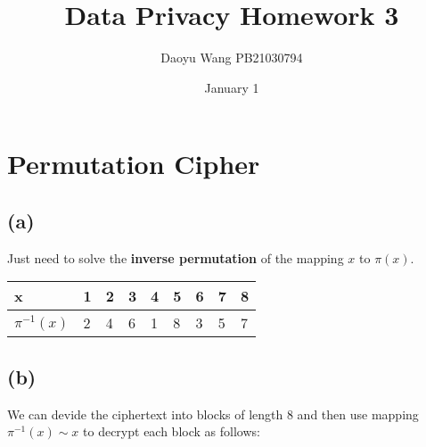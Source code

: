 \documentclass[a4paper,12pt]{article}
\title{Data Privacy Homework 3}
\author{Daoyu Wang  PB21030794}
\date{January 1}
\begin{document}
\maketitle
{}
\tableofcontents
\newpage
\section{Permutation Cipher}
\subsection{(a)}
Just need to solve the \textbf{inverse permutation} of the mapping $x$ to $\pi(x)$.
\begin{table}[!ht]
    \centering
    \begin{tabular}{|l|l|l|l|l|l|l|l|l|}
        \hline
        \textbf{x}             & \textbf{1} & \textbf{2} & \textbf{3} & \textbf{4} & \textbf{5} & \textbf{6} & \textbf{7} & \textbf{8} \\ \hline
        \textbf{$\pi^{-1}(x)$} & 2          & 4          & 6          & 1          & 8          & 3          & 5          & 7          \\ \hline
    \end{tabular}
\end{table}
\subsection{(b)}
We can devide the ciphertext into blocks of length $8$ and then use mapping $\pi^{-1}(x) \sim x $ to decrypt each block as follows:
\end{document}
